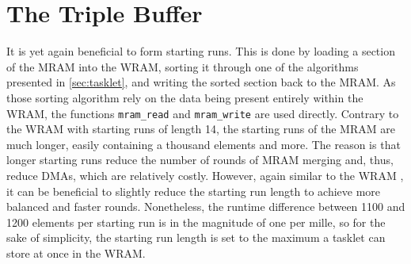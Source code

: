 \section{The Triple Buffer}
\label{sec:mram:triple}

It is yet again beneficial to form starting runs.
This is done by loading a section of the MRAM into the WRAM, sorting it through one of the algorithms presented in \cref{sec:tasklet}, and writing the sorted section back to the MRAM.
As those sorting algorithm rely on the data being present entirely within the WRAM, the functions \lstinline|mram_read| and \lstinline|mram_write| are used directly.
Contrary to the WRAM \MS*{} with starting runs of length 14, the starting runs of the MRAM \MS{} are much longer, easily containing a thousand elements and more.
The reason is that longer starting runs reduce the number of rounds of MRAM merging and, thus, reduce DMAs, which are relatively costly.
However, again similar to the WRAM \MS*{}, it can be beneficial to slightly reduce the starting run length to achieve more balanced and faster rounds.
Nonetheless, the runtime difference between 1100 and 1200 elements per starting run is in the magnitude of one per mille, so for the sake of simplicity, the starting run length is set to the maximum a tasklet can store at once in the WRAM.


